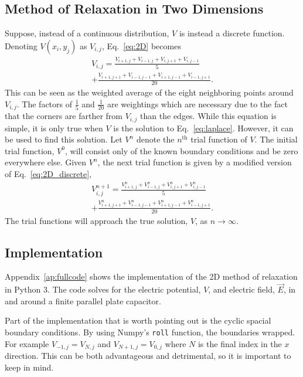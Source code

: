 \documentclass[12pt,twocolumn]{article}
\begin{document}
\subsection{Method of Relaxation in Two Dimensions}
Suppose, instead of a continuous distribution, $V$ is instead a discrete function. Denoting $V(x_i,y_j)$ as $V_{i,j}$, Eq.~\ref{eq:2D} becomes~\cite{Jackson99}
\begin{equation}
\begin{split}
V_{i,j} = \frac{V_{i+1,j}+V_{i-1,j}+V_{i,j+1}+V_{i,j-1}}{5} \\
        + \frac{V_{i+1,j+1}+V_{i-1,j-1} +V_{i+1,j-1}+V_{i-1,j+1}}{20}.
\label{eq:2D_discrete}
\end{split}
\end{equation}
This can be seen as the weighted average of the eight neighboring points around $V_{i,j}$. The factors of $\frac{1}{5}$ and $\frac{1}{20}$ are weightings which are necessary due to the fact that the corners are farther from $V_{i,j}$ than the edges. While this equation is simple, it is only true when $V$ is the solution to Eq.~\ref{eq:laplace}. However, it can be used to find this solution. Let $V^n$ denote the $n^{\mathrm{th}}$ trial function of $V$. The initial trial function, $V^0$, will consist only of the known boundary conditions and be zero everywhere else. Given $V^n$, the next trial function is given by a modified version of Eq.~\ref{eq:2D_discrete},
\begin{equation}
\begin{split}
V^{n+1}_{i,j} = \frac{V^{n}_{i+1,j}+V^{n}_{i-1,j}+V^{n}_{i,j+1}+V^{n}_{i,j-1}}{5} \\
        + \frac{V^{n}_{i+1,j+1}+V^{n}_{i-1,j-1} +V^{n}_{i+1,j-1}+V^{n}_{i-1,j+1}}{20}.
\label{eq:2D_iterations}
\end{split}
\end{equation}
The trial functions will approach the true solution, $V$, as $n\rightarrow\infty$.
\subsection{Implementation}
Appendix~\ref{ap:fullcode} shows the implementation of the 2D method of relaxation in Python 3. The code solves for the electric potential, $V$, and electric field, $\vec{E}$, in and around a finite parallel plate capacitor.

Part of the implementation that is worth pointing out is the cyclic spacial boundary conditions. By using Numpy's \texttt{roll} function, the boundaries wrapped. For example $V_{-1,j}=V_{N,j}$ and $V_{N+1,j}=V_{0,j}$ where $N$ is the final index in the $x$ direction. This can be both advantageous and detrimental, so it is important to keep in mind.
\end{document}
